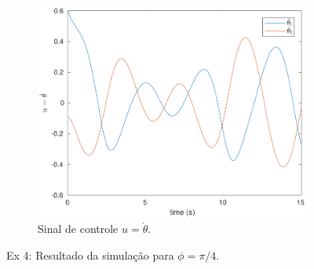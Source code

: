\documentclass[a4paper,11pt]{article}
\theoremstyle{mytheor}
\begin{document}
\begin{figure}[ht]
\begin{minipage}{\linewidth}
    \begin{subfigure}[b]{0.49\textwidth}
    \includegraphics[width=1\textwidth]{figs/ex3_2_dq.pdf}
    \caption{Sinal de controle $u = \dot{\theta}$.}
    \label{fig:ex3_2_dq}
    \end{subfigure}
  \end{minipage}
\caption{Ex 4: Resultado da simulação para $\phi = \pi/4$.}
\label{fig:ex3_2}
\end{figure}
\end{document}
